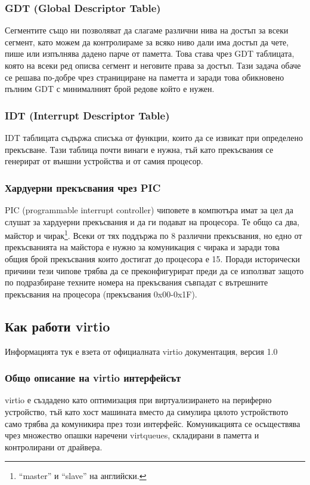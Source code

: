 \subsubsection{GDT (Global Descriptor Table)} \label{gdt}
Сегментите също ни позволяват да слагаме различни нива на достъп за всеки сегмент, като можем да контролираме за всяко ниво дали има достъп да чете, пише или изпълнява дадено парче от паметта. Това става чрез GDT таблицата, която на всеки ред описва сегмент и неговите права за достъп. Тази задача обаче се решава по-добре чрез странициране на паметта и заради това обикновено пълним GDT с минималният брой редове който е нужен.

\subsubsection{IDT (Interrupt Descriptor Table)} \label{idt}
IDT таблицата съдържа списъка от функции, които да се извикат при определено прекъсване. Тази таблица почти винаги е нужна, тъй като прекъсвания се генерират от външни устройства и от самия процесор.

\subsubsection{Хардуерни прекъсвания чрез PIC} \label{pic}
PIC (programmable interrupt controller) чиповете в компютъра имат за цел да слушат за хардуерни прекъсвания и да ги подават на процесора. Те общо са два, майстор и чирак\footnote{``master'' и ``slave'' на английски.}. Всеки от тях поддържа по 8 различни прекъсвания, но едно от прекъсванията на майстора е нужно за комуникация с чирака и заради това общия брой прекъсвания които достигат до процесора е 15. Поради исторически причини тези чипове трябва да се преконфигурират преди да се използват защото по подразбиране техните номера на прекъсвания съвпадат с вътрешните прекъсвания на процесора (прекъсвания 0x00-0x1F).

\subsection{Как работи virtio}
Информацията тук е взета от официалната virtio документация, версия 1.0\parencite{virtiodocs}
\subsubsection{Общо описание на virtio интерфейсът}
virtio е създадено като оптимизация при виртуализирането на периферно устройство, тъй като хост машината вместо да симулира цялото устройството само трябва да комуникира през този интерфейс. Комуникацията се осъществява чрез множество опашки наречени virtqueues, складирани в паметта и контролирани от драйвера.

